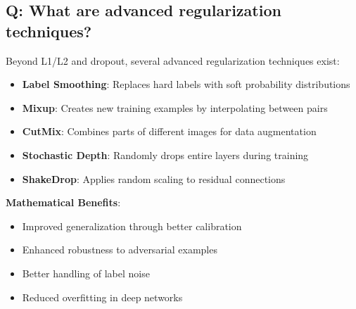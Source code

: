 \subsection*{\textcolor{primaryteal}{Q: What are advanced regularization techniques?}}
Beyond L1/L2 and dropout, several advanced regularization techniques exist:

\begin{itemize}
	\item \textbf{Label Smoothing}: Replaces hard labels with soft probability distributions
	\item \textbf{Mixup}: Creates new training examples by interpolating between pairs
	\item \textbf{CutMix}: Combines parts of different images for data augmentation
	\item \textbf{Stochastic Depth}: Randomly drops entire layers during training
	\item \textbf{ShakeDrop}: Applies random scaling to residual connections
\end{itemize}

\textbf{Mathematical Benefits}:
\begin{itemize}
	\item Improved generalization through better calibration
	\item Enhanced robustness to adversarial examples
	\item Better handling of label noise
	\item Reduced overfitting in deep networks
\end{itemize}
